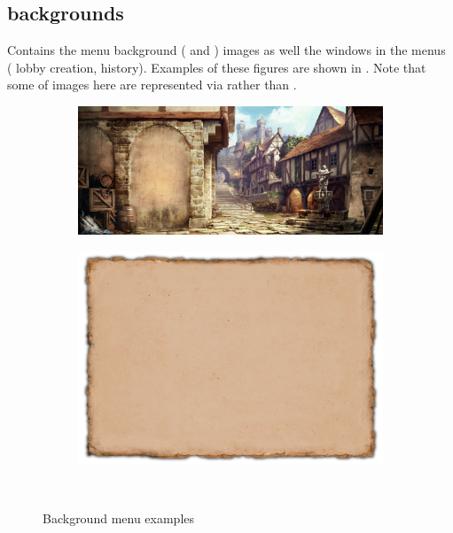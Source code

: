     \subsection{backgrounds}

    Contains the menu background ( and ) images as well the windows in the \aoe{} menus (\eg{} lobby creation, history). Examples of these figures are shown in . Note that some of images here are represented via  rather than .

    \begin{figure}
        \centering
        \begin{subfigure}{0.48\textwidth}
            \centering
            \includegraphics[width=1.0\textwidth]{src/images/mainmenu-bg}
        \end{subfigure}\quad%
        \begin{subfigure}{0.48\textwidth}
            \centering
            \includegraphics[width=1.0\textwidth]{src/images/popup-menu-bg}
        \end{subfigure}\\%
        \caption{Background menu examples}
        \label{fig:backgrounds}
    \end{figure}

